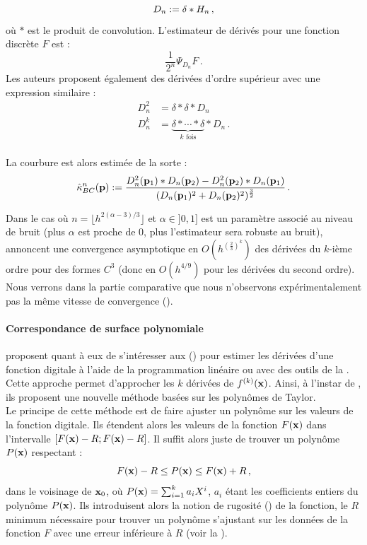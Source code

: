 %
\begin{equation}
  D_n := \delta \ast H_n \,,
\end{equation}
%
où $\ast$ est le produit de convolution. L'estimateur de dérivés pour une fonction discrète $F$ est :
%
\begin{equation}
  \frac{1}{2^n}\Psi_{D_n}F \,.
\end{equation}
%
Les auteurs proposent également des dérivées d'ordre supérieur avec une
expression similaire :
%
\begin{align}
  D_n^2 &= \delta \ast \delta \ast D_n \\
  D_n^k &= \underbrace{\delta \ast \cdots \ast \delta}_{k \text{ fois}} \ast D_n \,.
\end{align}
%
\\
%
La courbure est alors estimée de la sorte :
%
\begin{equation}
  \hat{\kappa}^{n}_{BC}(\mathbf{p}) := \frac{D_n^2(\mathbf{p}_1) \ast D_n(\mathbf{p}_2) - D_n^2(\mathbf{p}_2) \ast D_n(\mathbf{p}_1)}{(D_n(\mathbf{p}_1)^2 + D_n(\mathbf{p}_2)^2)^\frac{3}{2}} \,.
\end{equation}


Dans le cas où $n = \lfloor h^{2(\alpha -3)/3} \rfloor$ et $\alpha \in ]0,1]$ est un paramètre
associé au niveau de bruit (plus $\alpha$ est proche de $0$, plus l'estimateur
sera robuste au bruit),  annoncent une convergence asymptotique en
$O(h^{{(\frac{2}{3})}^k})$ des dérivées du $k$-ième ordre pour des formes $C^3$ (donc en
$O(h^{4/9})$ pour les dérivées du second ordre). Nous verrons dans la partie
comparative que nous n'observons expérimentalement pas la même vitesse de
convergence ().
%
\paragraph{Correspondance de surface polynomiale}
%
 proposent quant à eux de s'intéresser aux
 (\DLL) pour estimer les dérivées d'une fonction
digitale à l'aide de la programmation linéaire ou avec des outils de la
\AlgorithmicGeometry. Cette approche permet d'approcher les $k$ dérivées de
$f^{(k)}(\mathbf{x})$. Ainsi, à l'instar de \JetFitting, ils proposent une nouvelle
méthode basées sur les polynômes de Taylor.
%
\\
%
Le principe de cette méthode est de faire ajuster un polynôme sur les valeurs de
la fonction digitale. Ils étendent alors les valeurs de la fonction $F(\mathbf{x})$
dans l'intervalle $[F(\mathbf{x}) - R; F(\mathbf{x}) - R]$. Il suffit alors juste de trouver
un polynôme $P(\mathbf{x})$ respectant :
%
\begin{equation}
    F(\mathbf{x}) - R \le P(\mathbf{x}) \le F(\mathbf{x}) + R \,,
\end{equation}
%
dans le voisinage de $\mathbf{x}_0$, où $P(\mathbf{x}) = \sum_{i=1}^{k} a_iX^i$, $a_i$
étant les coefficients entiers du polynôme $P(\mathbf{x})$. Ils introduisent alors la notion de
rugosité () de la fonction, \cad le $R$ minimum nécessaire
pour trouver un polynôme s'ajustant sur les données de la fonction $F$ avec une
erreur inférieure à $R$ (voir la ).

